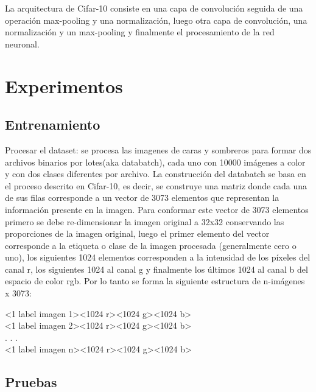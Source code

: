 \documentclass[10pt,twocolumn,letterpaper]{article}
\begin{document}
La arquitectura de Cifar-10 consiste en una capa de convolución seguida de una operación max-pooling y una normalización, luego otra capa de convolución, una normalización y un max-pooling y finalmente el procesamiento de la red neuronal.


\section{Experimentos}
\subsection{Entrenamiento}
Procesar el dataset: se procesa las imagenes de caras y sombreros para formar dos archivos binarios por lotes(aka databatch), cada uno con 10000 imágenes a color y con dos clases diferentes por archivo. La construcción del databatch se basa en el proceso descrito en Cifar-10, es decir, se construye una matriz donde cada una de sus filas corresponde a un vector de 3073 elementos que representan la información presente en la imagen. Para conformar este vector de 3073 elementos primero se debe re-dimensionar la imagen original a 32x32 conservando las proporciones de la imagen original, luego el primer elemento del vector corresponde a la etiqueta o clase de la imagen procesada (generalmente cero o uno), los siguientes 1024 elementos corresponden a la intensidad de los píxeles del canal r, los siguientes 1024 al canal g y finalmente los últimos 1024 al canal b del espacio de color rgb. Por lo tanto se forma la siguiente estructura de n-imágenes x 3073:


\begin{flushleft}
<1 label imagen 1><1024 r><1024 g><1024 b>\\
<1 label imagen 2><1024 r><1024 g><1024 b>\\
. . .\\
<1 label imagen n><1024 r><1024 g><1024 b>\\
\end{flushleft}


\subsection{Pruebas}
\end{document}
